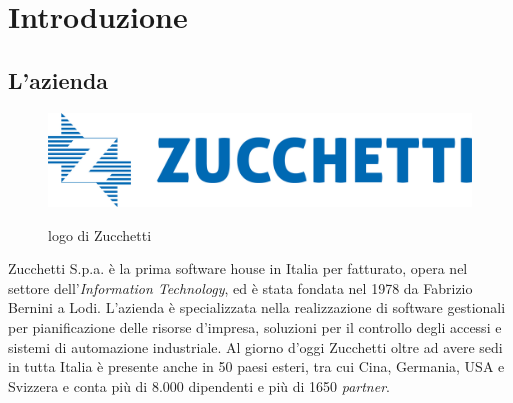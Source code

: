 \chapter{Introduzione}
\label{chap:introduzione}








\section{L'azienda}
\begin{figure}[h!]
    \centering
    \includegraphics[alt={Testo alternativo dell'immagine}, width=0.7\columnwidth]{img/logoZucchetti.jpeg}
    \caption{logo di Zucchetti}
    \label{fig:entanglement}
\end{figure}
Zucchetti S.p.a. è la prima software house in Italia per fatturato, opera nel settore dell'\textit{Information Technology}, ed è stata fondata nel 1978 da Fabrizio Bernini a Lodi. 
L'azienda è specializzata nella realizzazione di software gestionali per pianificazione delle risorse d'impresa, soluzioni per il controllo degli accessi e sistemi di automazione industriale. 
Al giorno d'oggi Zucchetti oltre ad avere sedi in tutta Italia è presente anche in 50 paesi esteri, tra cui Cina, Germania, USA e Svizzera e conta più di 8.000 dipendenti e più di 1650 \textit{partner}.

